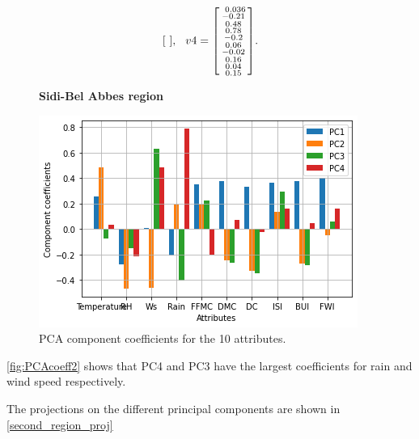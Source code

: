 \documentclass[10pt]{article}
\numberwithin{equation}{section}
\numberwithin{figure}{section}
\numberwithin{table}{section}
\begin{document}
\begin{equation*}
\begin{bsmallmatrix}
        \end{bsmallmatrix}, \hspace{7pt}
    v4 = 
        \begin{bsmallmatrix}
            \
                0.036\\
                -0.21\\
                0.48\\
                0.78\\
                -0.2\\
                0.06\\
                -0.02\\
                0.16\\
                0.04\\
                0.15
           
        \end{bsmallmatrix}.
                  
\end{equation*}

\begin{figure} [H]
    \centering
    \textbf{Sidi-Bel Abbes region}\par\medskip
    \includegraphics[scale=0.5]{Figures/PC_components_coeff_second_region.png}
    \caption{PCA component coefficients for the 10 attributes.}
    \label{fig:PCAcoeff2}
\end{figure}

\autoref{fig:PCAcoeff2} shows that PC4 and PC3 have the largest coefficients for rain and wind speed respectively.

The projections on the different principal components are shown in \autoref{second_region_proj}
\end{document}
